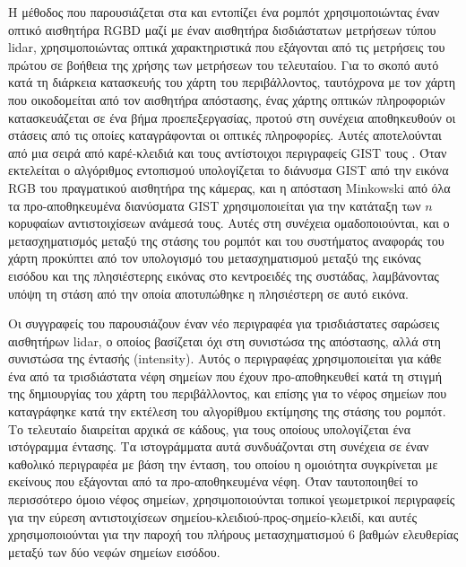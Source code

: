 Η μέθοδος που παρουσιάζεται στα \cite{Su2017} και \cite{Chen2019b} εντοπίζει
ένα ρομπότ χρησιμοποιώντας έναν οπτικό αισθητήρα RGBD μαζί με έναν αισθητήρα
δισδιάστατων μετρήσεων τύπου lidar, χρησιμοποιώντας οπτικά χαρακτηριστικά που
εξάγονται από τις μετρήσεις του πρώτου σε βοήθεια της χρήσης των μετρήσεων του
τελευταίου. Για το σκοπό αυτό κατά τη διάρκεια κατασκευής του χάρτη του
περιβάλλοντος, ταυτόχρονα με τον χάρτη που οικοδομείται από τον αισθητήρα
απόστασης, ένας χάρτης οπτικών πληροφοριών κατασκευάζεται σε ένα βήμα
προεπεξεργασίας, προτού στη συνέχεια αποθηκευθούν οι στάσεις από τις οποίες
καταγράφονται οι οπτικές πληροφορίες. Αυτές αποτελούνται από μια σειρά από
καρέ-κλειδιά και τους αντίστοιχοι περιγραφείς GIST τους
\cite{Singh2010,Azzi2015}. Όταν εκτελείται ο αλγόριθμος εντοπισμού
υπολογίζεται το διάνυσμα GIST από την εικόνα RGB του πραγματικού αισθητήρα της
κάμερας, και η απόσταση Minkowski από όλα τα προ-αποθηκευμένα διανύσματα GIST
χρησιμοποιείται για την κατάταξη των $n$ κορυφαίων αντιστοιχίσεων ανάμεσά τους.
Αυτές στη συνέχεια ομαδοποιούνται, και ο μετασχηματισμός μεταξύ της στάσης του
ρομπότ και του συστήματος αναφοράς του χάρτη προκύπτει από τον υπολογισμό του
μετασχηματισμού μεταξύ της εικόνας εισόδου και της πλησιέστερης εικόνας στο
κεντροειδές της συστάδας, λαμβάνοντας υπόψη τη στάση από την οποία αποτυπώθηκε
η πλησιέστερη σε αυτό εικόνα.

Οι συγγραφείς του \cite{Cop2018} παρουσιάζουν έναν νέο περιγραφέα για
τρισδιάστατες σαρώσεις αισθητήρων lidar, ο οποίος βασίζεται όχι στη συνιστώσα
της απόστασης, αλλά στη συνιστώσα της έντασής (intensity). Αυτός ο περιγραφέας
χρησιμοποιείται για κάθε ένα από τα τρισδιάστατα νέφη σημείων που έχουν
προ-αποθηκευθεί κατά τη στιγμή της δημιουργίας του χάρτη του περιβάλλοντος, και
επίσης για το νέφος σημείων που καταγράφηκε κατά την εκτέλεση του αλγορίθμου
εκτίμησης της στάσης του ρομπότ. Το τελευταίο διαιρείται αρχικά σε κάδους, για
τους οποίους υπολογίζεται ένα ιστόγραμμα έντασης. Τα ιστογράμματα αυτά
συνδυάζονται στη συνέχεια σε έναν καθολικό περιγραφέα με βάση την ένταση, του
οποίου η ομοιότητα συγκρίνεται με εκείνους που εξάγονται από τα
προ-αποθηκευμένα νέφη. Όταν ταυτοποιηθεί το περισσότερο όμοιο νέφος σημείων,
χρησιμοποιούνται τοπικοί γεωμετρικοί περιγραφείς για την εύρεση αντιστοιχίσεων
σημείου-κλειδιού-προς-σημείο-κλειδί, και αυτές χρησιμοποιούνται για την παροχή
του πλήρους μετασχηματισμού $6$ βαθμών ελευθερίας μεταξύ των δύο νεφών σημείων
εισόδου.

